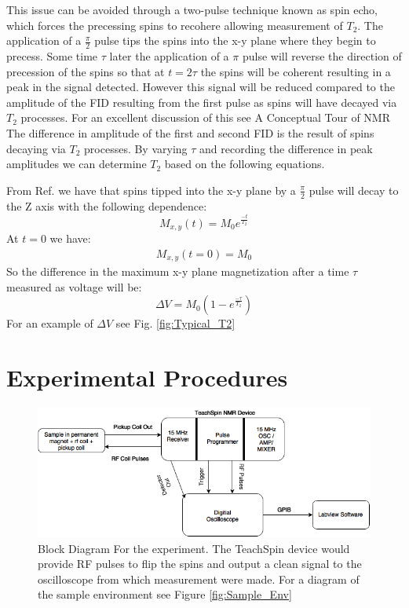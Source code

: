 \documentclass[11pt,letterpaper]{article}
\begin{document}
This issue can be avoided through a two-pulse technique known as spin echo, which forces the precessing spins to recohere allowing measurement of $T_2$. The application of a $\frac{\pi}{2}$ pulse tips the spins into the x-y plane where they begin to precess. Some time $\tau$ later the application of a $\pi$ pulse will reverse the direction of precession of the spins so that at $t=2\tau$ the spins will be coherent resulting in a peak in the signal detected. However this signal will be reduced compared to the amplitude of the FID resulting from the first pulse as spins will have decayed via $T_2$ processes. For an excellent discussion of this see A Conceptual Tour of NMR \cite{Concept_Tour} The difference in amplitude of the first and second FID is the result of spins decaying via $T_2$ processes. By varying $\tau$ and recording the difference in peak amplitudes we can determine $T_2$ based on the following equations.

From Ref. \cite{TeachspinManual} we have that spins tipped into the x-y plane by a $\frac{\pi}{2}$ pulse will decay to the Z axis with the following dependence:
\begin{equation}
M_{x,y}(t)=M_0e^{\frac{-t}{T_2}}
\end{equation}
At $t=0$ we have:
\begin{align}
M_{x,y}(t=0)=M_0
\end{align}
So the difference in the maximum x-y plane magnetization after a time $\tau$ measured as voltage will be:
\begin{equation}
\label{eq:T2_Fit}
\Delta V=M_0(1-e^{\frac{-\tau}{T_2}})
\end{equation}
For an example of $\Delta V$ see Fig. \ref{fig:Typical_T2}

\section{Experimental Procedures}
\begin{figure}[h!]
  \centering
      \includegraphics[scale=.4]{NMR_Block_Diagram.png}
      \caption{Block Diagram For the experiment. The TeachSpin device would provide RF pulses to flip the spins and output a clean signal to the oscilloscope from which measurement were made. For a diagram of the sample environment see Figure \ref{fig:Sample_Env}}
      \label{fig:Block_Diagram}
\end{figure}
\end{document}
